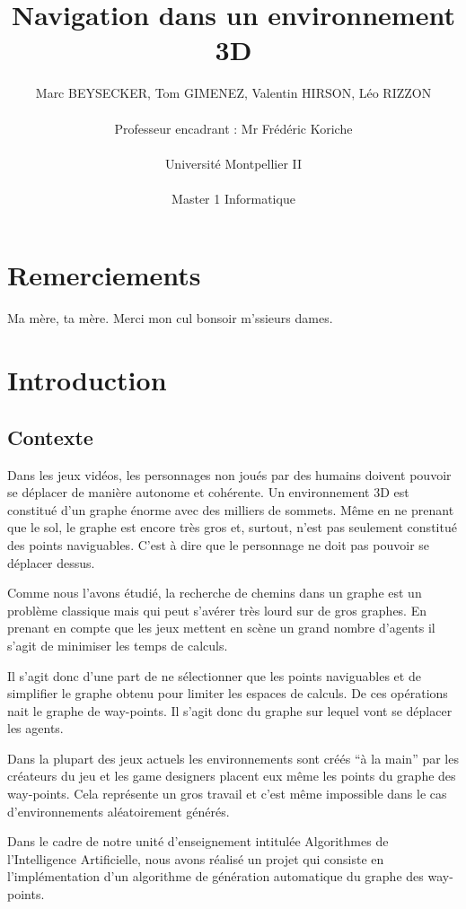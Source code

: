 \documentclass[a4paper,12pt]{report}
\title{Navigation dans un environnement 3D \vspace{0.5cm}}
\author{Marc BEYSECKER, Tom GIMENEZ, Valentin HIRSON, Léo RIZZON\\  \\Professeur encadrant : Mr Frédéric Koriche \\ \\Université Montpellier II \\  \\Master 1 Informatique}
\date{}
\begin{document}
\maketitle

\tableofcontents

\newpage

\chapter*{Remerciements}

Ma mère, ta mère. Merci mon cul bonsoir m'ssieurs dames.

\chapter{Introduction}


\section*{Contexte}

Dans les jeux vidéos, les personnages non joués par des humains doivent pouvoir se déplacer de manière autonome et cohérente. Un environnement 3D est constitué d'un graphe énorme avec des milliers de sommets. Même en ne prenant que le sol, le graphe est encore très gros et, surtout, n'est pas seulement constitué des points naviguables. C'est à dire que le personnage ne doit pas pouvoir se déplacer dessus.

Comme nous l'avons étudié, la recherche de chemins dans un graphe est un problème classique mais qui peut s'avérer très lourd sur de gros graphes. En prenant en compte que les jeux mettent en scène un grand nombre d'agents il s'agit de minimiser les temps de calculs. 

Il s'agit donc d'une part de ne sélectionner que les points naviguables et de simplifier le graphe obtenu pour limiter les espaces de calculs. De ces opérations nait le graphe de way-points. Il s'agit donc du graphe sur lequel vont se déplacer les agents.

Dans la plupart des jeux actuels les environnements sont créés ``à la main'' par les créateurs du jeu et les game designers placent eux même les points du graphe des way-points. Cela représente un gros travail et c'est même impossible dans le cas d'environnements aléatoirement générés.

Dans le cadre de notre unité d'enseignement intitulée Algorithmes de l'Intelligence Artificielle, nous avons réalisé un projet qui consiste en l'implémentation d'un algorithme de génération automatique du graphe des way-points.
\end{document}
